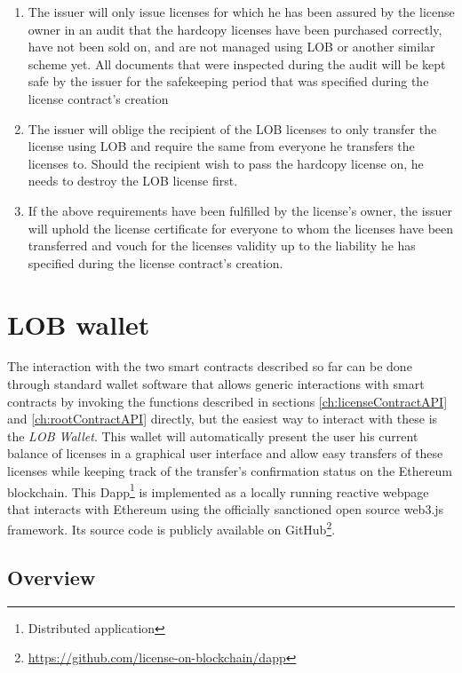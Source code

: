 \documentclass[a4paper]{article}
\begin{document}
\begin{enumerate}
  \item The issuer will only issue licenses for which he has been assured by the license owner in an audit that the hardcopy licenses have been purchased correctly, have not been sold on, and are not managed using LOB or another similar scheme yet. All documents that were inspected during the audit will be kept safe by the issuer for the safekeeping period that was specified during the license contract's creation
  \item The issuer will oblige the recipient of the LOB licenses to only transfer the license using LOB and require the same from everyone he transfers the licenses to. Should the recipient wish to pass the hardcopy license on, he needs to destroy the LOB license first.
  \item If the above requirements have been fulfilled by the license's owner, the issuer will uphold the license certificate for everyone to whom the licenses have been transferred and vouch for the licenses validity up to the liability he has specified during the license contract's creation.
\end{enumerate}



\section{LOB wallet}
\label{ch:wallet}

The interaction with the two smart contracts described so far can be done through standard wallet software that allows generic interactions with smart contracts by invoking the functions described in sections \ref{ch:licenseContractAPI} and \ref{ch:rootContractAPI} directly, but the easiest way to interact with these is the \emph{LOB Wallet}. This wallet will automatically present the user his current balance of licenses in a graphical user interface and allow easy transfers of these licenses while keeping track of the transfer's confirmation status on the Ethereum blockchain. This Dapp\footnote{Distributed application} is implemented as a locally running reactive webpage that interacts with Ethereum using the officially sanctioned open source web3.js framework. Its source code is publicly available on GitHub\footnote{\url{https://github.com/license-on-blockchain/dapp}}.

\subsection{Overview}
\end{document}
